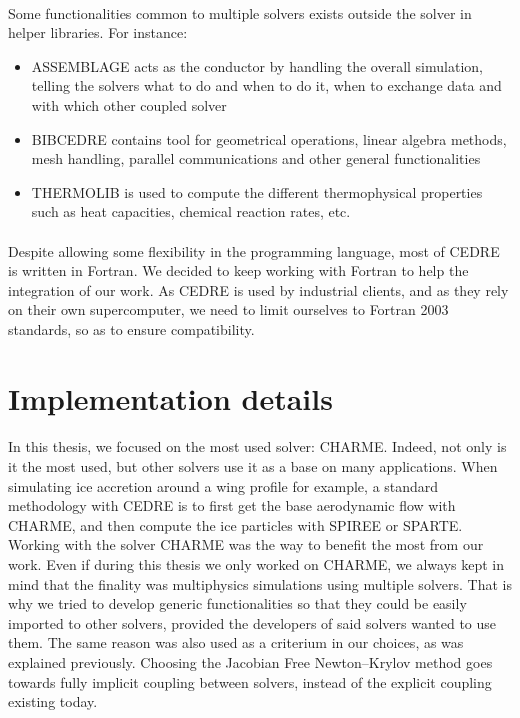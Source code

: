     \paragraph{}
    Some functionalities common to multiple solvers exists outside the solver in helper libraries.
    For instance:
    \begin{itemize}
      \item ASSEMBLAGE acts as the conductor by handling the overall simulation, telling the solvers what to do and when to do it, when to exchange data and with which other coupled solver
      \item BIBCEDRE contains tool for geometrical operations, linear algebra methods, mesh handling, parallel communications and other general functionalities
      \item THERMOLIB is used to compute the different thermophysical properties such as heat capacities, chemical reaction rates, etc. 
    \end{itemize}

    \paragraph{}
    Despite allowing some flexibility in the programming language, most of CEDRE is written in Fortran.
    We decided to keep working with Fortran to help the integration of our work.
    As CEDRE is used by industrial clients, and as they rely on their own supercomputer, we need to limit ourselves to Fortran 2003 standards, so as to ensure compatibility.


  \section{Implementation details}


    \paragraph{}
    In this thesis, we focused on the most used solver: CHARME.
    Indeed, not only is it the most used, but other solvers use it as a base on many applications.
    When simulating ice accretion around a wing profile for example, a standard methodology with CEDRE is to first get the base aerodynamic flow with CHARME, and then compute the ice particles with SPIREE or SPARTE.
    Working with the solver CHARME was the way to benefit the most from our work.
    Even if during this thesis we only worked on CHARME, we always kept in mind that the finality was multiphysics simulations using multiple solvers.
    That is why we tried to develop generic functionalities so that they could be easily imported to other solvers, provided the developers of said solvers wanted to use them.
    The same reason was also used as a criterium in our choices, as was explained previously.
    Choosing the Jacobian Free Newton--Krylov method goes towards fully implicit coupling between solvers, instead of the explicit coupling existing today.

